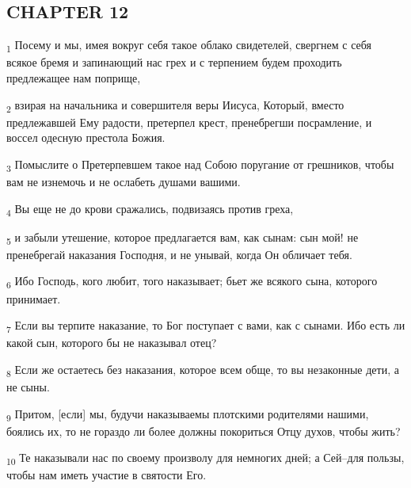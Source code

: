 \subsection{CHAPTER 12}
\begin{tcolorbox}
\textsubscript{1} Посему и мы, имея вокруг себя такое облако свидетелей, свергнем с себя всякое бремя и запинающий нас грех и с терпением будем проходить предлежащее нам поприще,
\end{tcolorbox}
\begin{tcolorbox}
\textsubscript{2} взирая на начальника и совершителя веры Иисуса, Который, вместо предлежавшей Ему радости, претерпел крест, пренебрегши посрамление, и воссел одесную престола Божия.
\end{tcolorbox}
\begin{tcolorbox}
\textsubscript{3} Помыслите о Претерпевшем такое над Собою поругание от грешников, чтобы вам не изнемочь и не ослабеть душами вашими.
\end{tcolorbox}
\begin{tcolorbox}
\textsubscript{4} Вы еще не до крови сражались, подвизаясь против греха,
\end{tcolorbox}
\begin{tcolorbox}
\textsubscript{5} и забыли утешение, которое предлагается вам, как сынам: сын мой! не пренебрегай наказания Господня, и не унывай, когда Он обличает тебя.
\end{tcolorbox}
\begin{tcolorbox}
\textsubscript{6} Ибо Господь, кого любит, того наказывает; бьет же всякого сына, которого принимает.
\end{tcolorbox}
\begin{tcolorbox}
\textsubscript{7} Если вы терпите наказание, то Бог поступает с вами, как с сынами. Ибо есть ли какой сын, которого бы не наказывал отец?
\end{tcolorbox}
\begin{tcolorbox}
\textsubscript{8} Если же остаетесь без наказания, которое всем обще, то вы незаконные дети, а не сыны.
\end{tcolorbox}
\begin{tcolorbox}
\textsubscript{9} Притом, [если] мы, будучи наказываемы плотскими родителями нашими, боялись их, то не гораздо ли более должны покориться Отцу духов, чтобы жить?
\end{tcolorbox}
\begin{tcolorbox}
\textsubscript{10} Те наказывали нас по своему произволу для немногих дней; а Сей--для пользы, чтобы нам иметь участие в святости Его.
\end{tcolorbox}
